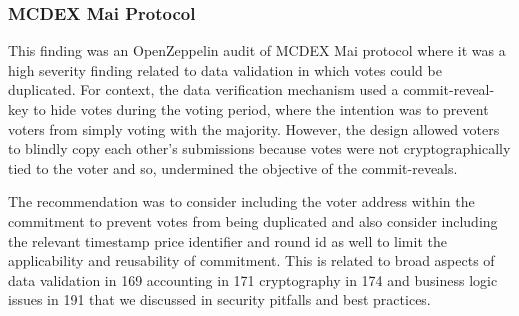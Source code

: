 \subsubsection{MCDEX Mai Protocol}\label{mcdex-mai-protocol}

This finding was an OpenZeppelin audit of MCDEX Mai protocol where it
was a high severity finding related to data validation in which votes
could be duplicated. For context, the data verification mechanism used a
commit-reveal-key to hide votes during the voting period, where the
intention was to prevent voters from simply voting with the majority.
However, the design allowed voters to blindly copy each other's
submissions because votes were not cryptographically tied to the voter
and so, undermined the objective of the commit-reveals.

The recommendation was to consider including the voter address within
the commitment to prevent votes from being duplicated and also consider
including the relevant timestamp price identifier and round id as well
to limit the applicability and reusability of commitment. This is
related to broad aspects of data validation in 169 accounting in 171
cryptography in 174 and business logic issues in 191 that we discussed
in security pitfalls and best practices.
